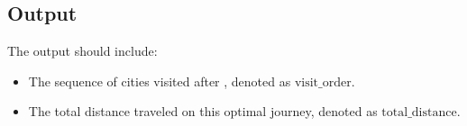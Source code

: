 \documentclass{article}
\begin{document}
\subsection*{Output}
The output should include:
\begin{itemize}
    \item The sequence of cities visited after , denoted as \( \text{visit\_order} \).
    \item The total distance traveled on this optimal journey, denoted as \( \text{total\_distance} \).
\end{itemize}
\end{document}
